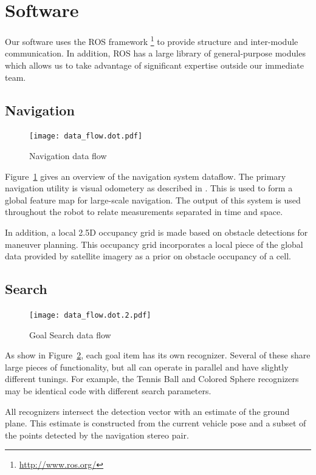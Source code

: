 \documentclass[12pt]{article}
\begin{document}
\section{Software}\label{Software}
Our software uses the ROS framework \footnote{\url{http://www.ros.org/}} to provide structure and inter-module communication. In addition, ROS has a large library of general-purpose modules which allows us to take advantage of significant expertise outside our immediate team.

\subsection{Navigation}\label{Navigation}
\begin{figure}[htbp]
\centering
\texttt{[image: data\_flow.dot.pdf]}
\caption{Navigation data flow}
\label{fig_df_nav}
\end{figure}
Figure~\ref{fig_df_nav} gives an overview of the navigation system dataflow. The primary navigation utility is visual odometery as described in \cite{KKonoLSVO}. This is used to form a global feature map for large-scale navigation. The output of this system is used throughout the robot to relate measurements separated in time and space.

In addition, a local 2.5D occupancy grid is made based on obstacle detections for maneuver planning. This occupancy grid incorporates a local piece of the global data provided by satellite imagery as a prior on obstacle occupancy of a cell.

\subsection{Search}\label{Search}
\begin{figure}[htbp]
\centering
\texttt{[image: data\_flow.dot.2.pdf]}
\caption{Goal Search data flow}
\label{fig_df_gs}
\end{figure}
As show in Figure~\ref{fig_df_gs}, each goal item has its own recognizer. Several of these share large pieces of functionality, but all can operate in parallel and have slightly different tunings. For example, the Tennis Ball and Colored Sphere recognizers may be identical code with different search parameters.

All recognizers intersect the detection vector with an estimate of the ground plane. This estimate is constructed from the current vehicle pose and a subset of the points detected by the navigation stereo pair.
\end{document}

